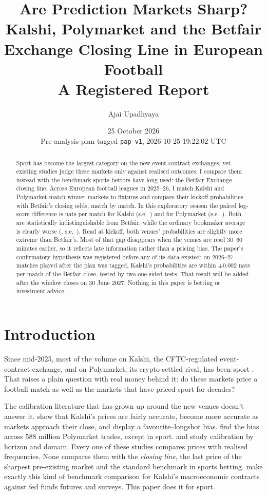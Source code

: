 \documentclass[11pt]{article}
\title{Are Prediction Markets Sharp?\\[0.3em]
\large Kalshi, Polymarket and the Betfair Exchange Closing Line in European Football\\[0.2em]
\normalsize A Registered Report}
\author{Ajai Upadhyaya}
\date{25 October 2026\\[0.3em]\small Pre-analysis plan tagged \texttt{pap-v1}, 2026-10-25 19:22:02 UTC}
\begin{document}
\maketitle

\begin{abstract}
\noindent Sport has become the largest category on the new event-contract exchanges, yet
existing studies judge these markets only against realised outcomes. I compare them instead with
the benchmark sports bettors have long used: the Betfair Exchange closing line. Across
\nLeagues{} European football leagues in 2025--26, I match \nKalshiMatched{} Kalshi and
\nPmMatched{} Polymarket match-winner markets to fixtures and compare their kickoff
probabilities with Betfair's closing odds, match by match. In this exploratory season the
paired log-score difference is \rqOneMeanK{} nats per match for Kalshi (s.e.\ \rqOneSeK) and
\rqOneMeanP{} for Polymarket (s.e.\ \rqOneSeP). Both are statistically indistinguishable from
Betfair, while the ordinary bookmaker average is clearly worse (\rqOneMeanAvg, s.e.\
\rqOneSeAvg). Read at kickoff, both venues' probabilities are slightly more extreme than
Betfair's. Most of that gap disappears when the venues are read 30--60 minutes earlier, so it
reflects late information rather than a pricing bias. The paper's confirmatory hypothesis was
registered before any of its data existed: on 2026--27 matches played after the plan was
tagged, Kalshi's probabilities are within $\pm 0.002$ nats per match of the Betfair close,
tested by two one-sided tests. That result will be added after the window closes on 30 June
2027. Nothing in this paper is betting or investment advice.
\end{abstract}

\section{Introduction}

Since mid-2025, most of the volume on Kalshi, the CFTC-regulated event-contract exchange, and on
Polymarket, its crypto-settled rival, has been sport \citep{pew2026}. That raises a plain
question with real money behind it: do these markets price a football match as well as the
markets that have priced sport for decades?

The calibration literature that has grown up around the new venues doesn't answer it.
\citet{burgi2025} show that Kalshi's prices are fairly accurate, become more accurate as markets
approach their close, and display a favourite--longshot bias. \citet{cardozo2026} find the bias
across 588 million Polymarket trades, except in sport. \citet{moshrefi2026} and \citet{le2026}
study calibration by horizon and domain. Every one of these studies compares prices with
realised frequencies. None compares them with the \emph{closing line}, the last price of the
sharpest pre-existing market and the standard benchmark in sports betting. \citet{diercks2026}
make exactly this kind of benchmark comparison for Kalshi's macroeconomic contracts against fed
funds futures and surveys. This paper does it for sport.
\end{document}
